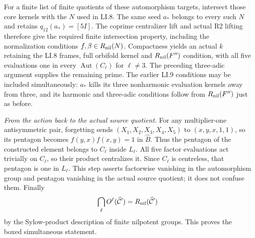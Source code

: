 For a finite list of finite quotients of these
automorphism targets, intersect those core kernels
with the $N$ used in LI.8. The same seed $a_*$ belongs
to every such $N$ and retains $q_{12}(a_*)=[5I]$.
The coprime centralizer lift and actual R2 lifting
therefore give the required finite intersection
property, including the normalization conditions
$f,\beta\in R_{\rm nil}(N)$. Compactness yields an
actual $k$ retaining the LI.8 frames, full orbifold
kernel and $R_{\rm nil}(F'')$ condition, with all
five evaluations one in every
$\operatorname{Aut}(C_\ell)$ for $\ell\ne3$.
The preceding three-adic argument supplies the
remaining prime. The earlier LI.9 conditions may be
included simultaneously: $a_*$ kills its three
nonharmonic evaluation kernels away from three,
and its harmonic and three-adic conditions follow
from $R_{\rm nil}(F'')$ just as before.

\emph{From the action back to the actual source quotient.}
For any multiplier-one antisymmetric pair, forgetting
sends $(X_1,X_2,X_3,X_4,X_5)$ to $(x,y,x,1,1)$,
so its pentagon becomes $f(y,x)f(x,y)=1$ in
$\widehat B$. Thus the pentagon of the constructed
element belongs to $C_\ell$ inside $L_\ell$.
All five factor evaluations act trivially on $C_\ell$,
so their product centralizes it. Since $C_\ell$ is
centreless, that pentagon is one in $L_\ell$.
This step asserts factorwise vanishing in the
automorphism group and pentagon vanishing in the
actual source quotient; it does not confuse them.
Finally
\[
 \bigcap_\ell O^\ell(\widehat{\mathcal C}')
             =R_{\rm nil}(\widehat{\mathcal C}')
\]
by the Sylow-product description of finite nilpotent
groups. This proves the boxed simultaneous statement.
